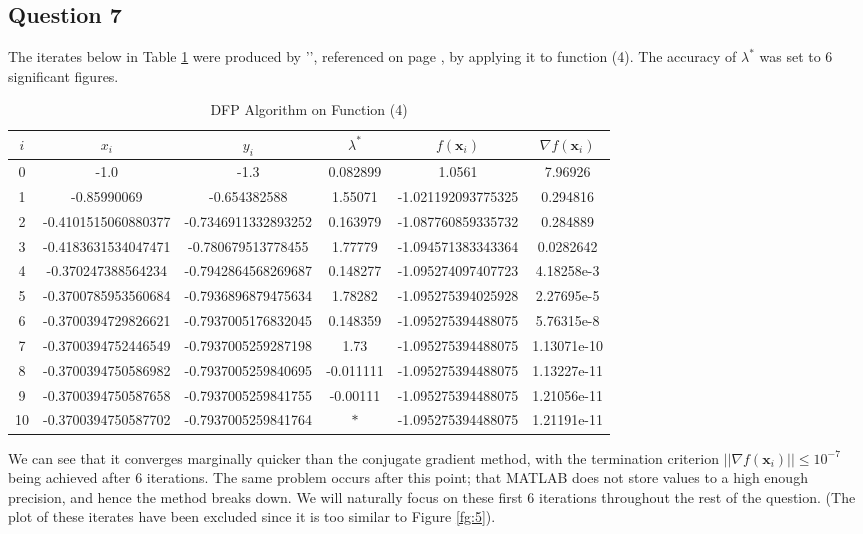 \documentclass[10pt,a4paper,notitlepage]{article}
\newcommand{\abs}[1]{\lvert#1\rvert}
\newcommand{\x}{\mathbf{x}}
\begin{document}
\subsection*{\centering Question 7}
The iterates below in Table \ref{tb:5} were produced by '', referenced on page \pageref{cd:3}, by applying it to function (4). The accuracy of $\lambda^{*}$ was set to 6 significant figures. 
\begin{table}[H]
\centering
\begin{tabular}{|cccccc|} \hline $i$ & $x_{i}$ & $y_{i}$ & $\lambda^{*}$ & $f(\x_{i})$ & $\nabla f(\x_{i})$\\ 
\hline
0 & -1.0 & -1.3 & 0.082899 & 1.0561 & 7.96926\\ 
1 & -0.85990069 & -0.654382588 & 1.55071 & -1.021192093775325 & 0.294816\\ 
2 & -0.4101515060880377 & -0.7346911332893252 & 0.163979 & -1.087760859335732 & 0.284889\\ 
3 & -0.4183631534047471 & -0.780679513778455 & 1.77779 & -1.094571383343364 & 0.0282642\\ 
4 & -0.370247388564234 & -0.7942864568269687 & 0.148277 & -1.095274097407723 & 4.18258e-3\\ 
5 & -0.3700785953560684 & -0.7936896879475634 & 1.78282 & -1.095275394025928 & 2.27695e-5\\ 
6 & -0.3700394729826621 & -0.7937005176832045 & 0.148359 & -1.095275394488075 & 5.76315e-8\\ 
7 & -0.3700394752446549 & -0.7937005259287198 & 1.73 & -1.095275394488075 & 1.13071e-10\\ 
8 & -0.3700394750586982 & -0.7937005259840695 & -0.011111 & -1.095275394488075 & 1.13227e-11\\ 
9 & -0.3700394750587658 & -0.7937005259841755 & -0.00111 & -1.095275394488075 & 1.21056e-11\\ 
10 & -0.3700394750587702 & -0.7937005259841764 & $\ast$ & -1.095275394488075 & 1.21191e-11\\ \hline
\end{tabular}
\caption{DFP Algorithm on Function (4)}\label{tb:5}
\end{table}
We can see that it converges marginally quicker than the conjugate gradient method, with the termination criterion $\abs{\abs{\nabla f(\x_{i})}}\leq 10^{-7}$ being achieved after 6 iterations. The same problem occurs after this point; that MATLAB does not store values to a high enough precision, and hence the method breaks down. We will naturally focus on these first 6 iterations throughout the rest of the question. 
(The plot of these iterates have been excluded since it is too similar to Figure \ref{fg:5}). \\
\end{document}
